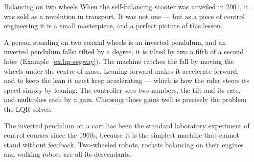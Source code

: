\begin{curiosity}{Balancing on two wheels}
When the self-balancing scooter was unveiled in 2001, it was sold as a revolution in transport. It was not one — but as a piece of control engineering it is a small masterpiece, and a perfect picture of this lesson.

A person standing on two coaxial wheels is an inverted pendulum, and an inverted pendulum falls: tilted by a degree, it is tilted by two a fifth of a second later (Example~\ref{ex:lqr-segway}). The machine catches the fall by moving the wheels under the centre of mass. Leaning forward makes it accelerate forward, and to keep the lean it must keep accelerating — which is how the rider steers its speed simply by leaning. The controller sees two numbers, the tilt and its rate, and multiplies each by a gain. Choosing those gains well is precisely the problem the LQR solves.

The inverted pendulum on a cart has been the standard laboratory experiment of control courses since the 1960s, because it is the simplest machine that cannot stand without feedback. Two-wheeled robots, rockets balancing on their engines and walking robots are all its descendants.
\end{curiosity}

